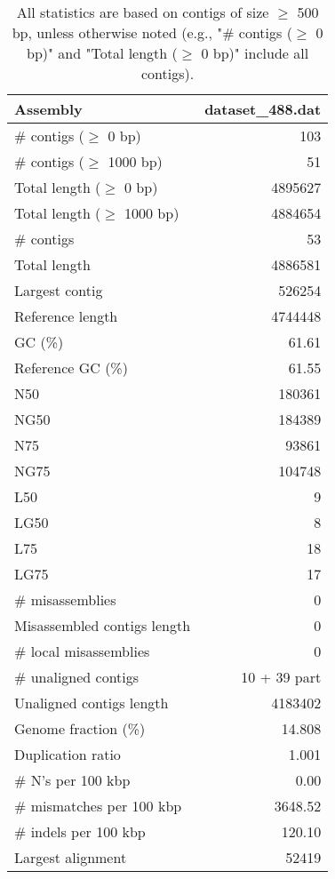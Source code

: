 \documentclass[12pt,a4paper]{article}
\begin{document}
\begin{table}[ht]
\begin{center}
\caption{All statistics are based on contigs of size $\geq$ 500 bp, unless otherwise noted (e.g., "\# contigs ($\geq$ 0 bp)" and "Total length ($\geq$ 0 bp)" include all contigs).}
\begin{tabular}{|l*{1}{|r}|}
\hline
Assembly & dataset\_488.dat \\ \hline
\# contigs ($\geq$ 0 bp) & 103 \\ \hline
\# contigs ($\geq$ 1000 bp) & 51 \\ \hline
Total length ($\geq$ 0 bp) & 4895627 \\ \hline
Total length ($\geq$ 1000 bp) & 4884654 \\ \hline
\# contigs & 53 \\ \hline
Total length & 4886581 \\ \hline
Largest contig & 526254 \\ \hline
Reference length & 4744448 \\ \hline
GC (\%) & 61.61 \\ \hline
Reference GC (\%) & 61.55 \\ \hline
N50 & 180361 \\ \hline
NG50 & 184389 \\ \hline
N75 & 93861 \\ \hline
NG75 & 104748 \\ \hline
L50 & 9 \\ \hline
LG50 & 8 \\ \hline
L75 & 18 \\ \hline
LG75 & 17 \\ \hline
\# misassemblies & 0 \\ \hline
Misassembled contigs length & 0 \\ \hline
\# local misassemblies & 0 \\ \hline
\# unaligned contigs & 10 + 39 part \\ \hline
Unaligned contigs length & 4183402 \\ \hline
Genome fraction (\%) & 14.808 \\ \hline
Duplication ratio & 1.001 \\ \hline
\# N's per 100 kbp & 0.00 \\ \hline
\# mismatches per 100 kbp & 3648.52 \\ \hline
\# indels per 100 kbp & 120.10 \\ \hline
Largest alignment & 52419 \\ \hline
\end{tabular}
\end{center}
\end{table}
\end{document}
